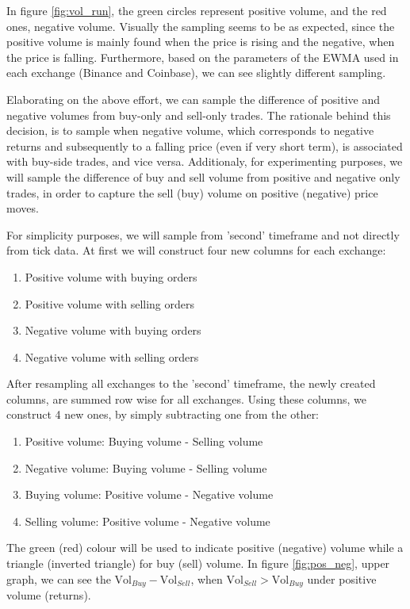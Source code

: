 In figure \ref{fig:vol_run}, the green circles represent positive volume, and the red ones, negative volume. Visually the sampling seems to be as expected, since the positive volume is mainly found when the price is rising and the negative, when the price is falling. Furthermore, based on the parameters of the EWMA used in each exchange (Binance and Coinbase), we can see slightly different sampling.

Elaborating on the above effort, we can sample the difference of positive and negative volumes from buy-only and sell-only trades. The rationale behind this decision, is to sample when negative volume, which corresponds to negative returns and subsequently to a falling price (even if very short term), is associated with buy-side trades, and vice versa. Additionaly, for experimenting purposes, we will sample the difference of buy and sell volume from positive and negative only trades, in order to capture the sell (buy) volume on positive (negative) price moves.

For simplicity purposes, we will sample from 'second' timeframe and not directly from tick data. At first we will construct four new columns for each exchange:

\begin{enumerate}
\item Positive volume with buying orders
\item Positive volume with selling orders
\item Negative volume with buying orders
\item Negative volume with selling orders
\end{enumerate}

After resampling all exchanges to the 'second' timeframe, the newly created columns, are summed row wise for all exchanges. Using these columns, we construct 4 new ones, by simply subtracting one from the other:

\begin{enumerate}
\item Positive volume: Buying volume - Selling volume
\item Negative volume: Buying volume - Selling volume
\item Buying volume: Positive volume - Negative volume
\item Selling volume: Positive volume - Negative volume
\end{enumerate}

The green (red) colour will be used to indicate positive (negative) volume while a triangle (inverted triangle) for buy (sell) volume. In figure \ref{fig:pos_neg}, upper graph, we can see the \(\text{Vol}_{Buy} - \text{Vol}_{Sell} \), when \(\text{Vol}_{Sell} > \text{Vol}_{Buy} \) under positive volume (returns). 
 
